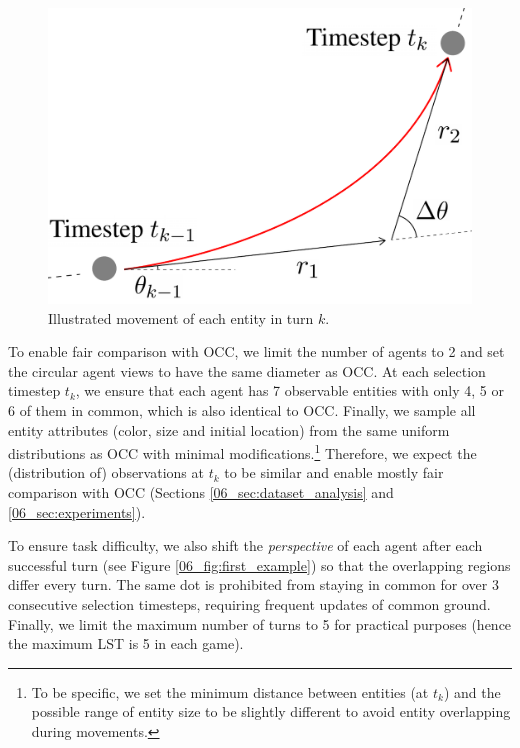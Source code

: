 \begin{figure}[th]
\centering
\includegraphics[width=0.5\columnwidth]{entity_move.pdf}
\caption{Illustrated movement of each entity in turn $k$.
}
\label{06_fig:entity_movement}
\end{figure}

To enable fair comparison with OCC, we limit the number of agents to 2 and set the circular agent views to have the same diameter as OCC. At each selection timestep $t_k$, we ensure that each agent has 7 observable entities with only 4, 5 or 6 of them in common, which is also identical to OCC. Finally, we sample all entity attributes (color, size and initial location) from the same uniform distributions as OCC with minimal modifications.\footnote{To be specific, we set the minimum distance between entities (at $t_k$) and the possible range of entity size to be slightly different to avoid entity overlapping during movements.} Therefore, we expect the (distribution of) observations at $t_k$ to be similar and enable mostly fair comparison with OCC (Sections \ref{06_sec:dataset_analysis} and \ref{06_sec:experiments}).

To ensure task difficulty, we also shift the \textit{perspective} of each agent after each successful turn (see Figure \ref{06_fig:first_example}) so that the overlapping regions differ every turn. The same dot is prohibited from staying in common for over 3 consecutive selection timesteps, requiring frequent updates of common ground. Finally, we limit the maximum number of turns to 5 for practical purposes (hence the maximum LST is 5 in each game).


